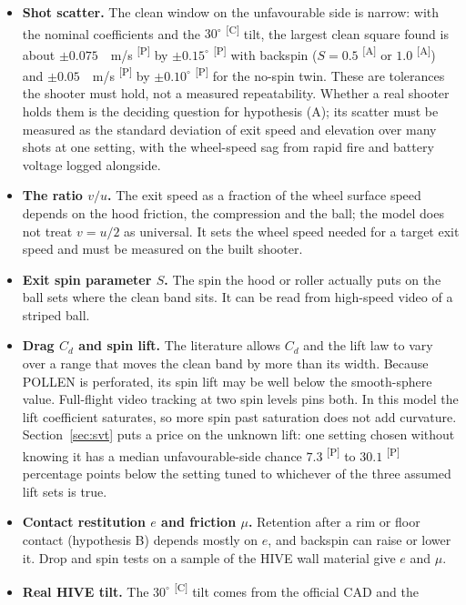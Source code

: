 \documentclass[11pt]{article}
\makeatletter
\DeclareRobustCommand{\provtag}[1]{%
  \ifmmode\text{\provtag@text{#1}}\else\provtag@text{#1}\fi}
\newcommand{\provtag@text}[1]{%
  \textsuperscript{\textsf{\upshape\scriptsize\color@grey[#1]}}}
\newcommand{\color@grey}[1]{#1}
\newcommand{\color@grey}[1]{\pdfliteral{0.45 g}#1\pdfliteral{0 g}}
\DeclareRobustCommand{\confirmed}{\provtag{C}}
\DeclareRobustCommand{\assumed}{\provtag{A}}
\DeclareRobustCommand{\predicted}{\provtag{P}}
\DeclareRobustCommand{\unit}[1]{%
  \ifmmode\text{\upshape #1}%
  \else
    \ifnum\lastnodetype=10 \,\fi
    \textup{#1}%
  \fi}
\makeatother
\begin{document}
\begin{itemize}
  \item \textbf{Shot scatter.} The clean window on the unfavourable side is narrow: with the nominal
    coefficients and the $30^\circ$\confirmed{} tilt, the largest clean square found is about
    $\pm0.075$\,\unit{m/s}\predicted{} by $\pm0.15^\circ$\predicted{} with backspin
    ($S=0.5$\assumed{} or $1.0$\assumed) and $\pm0.05$\,\unit{m/s}\predicted{} by
    $\pm0.10^\circ$\predicted{} for the no-spin twin. These are tolerances the shooter must hold, not
    a measured repeatability. Whether a real shooter holds them is the deciding question for
    hypothesis (A); its scatter must be measured as the standard deviation of exit speed and elevation
    over many shots at one setting, with the wheel-speed sag from rapid fire and battery voltage
    logged alongside.
  \item \textbf{The ratio $v/u$.} The exit speed as a fraction of the wheel surface speed depends on
    the hood friction, the compression and the ball; the model does not treat $v=u/2$ as universal.
    It sets the wheel speed needed for a target exit speed and must be measured on the built shooter.
  \item \textbf{Exit spin parameter $S$.} The spin the hood or roller actually puts on the ball sets
    where the clean band sits. It can be read from high-speed video of a striped ball.
  \item \textbf{Drag $C_d$ and spin lift.} The literature allows $C_d$ and the lift law to vary over a
    range that moves the clean band by more than its width. Because POLLEN is perforated, its spin lift
    may be well below the smooth-sphere value. Full-flight video tracking at two spin levels pins both.
    In this model the lift coefficient saturates, so more spin past saturation does not add curvature.
    Section~\ref{sec:svt} puts a price on the unknown lift: one setting chosen without knowing it has
    a median unfavourable-side chance $7.3$\predicted{} to $30.1$\predicted{} percentage points below
    the setting tuned to whichever of the three assumed lift sets is true.
  \item \textbf{Contact restitution $e$ and friction $\mu$.} Retention after a rim or floor contact
    (hypothesis B) depends mostly on $e$, and backspin can raise or lower it. Drop and spin tests on a
    sample of the HIVE wall material give $e$ and $\mu$.
  \item \textbf{Real HIVE tilt.} The $30^\circ$\confirmed{} tilt comes from the official CAD and the

\end{itemize}
\end{document}
